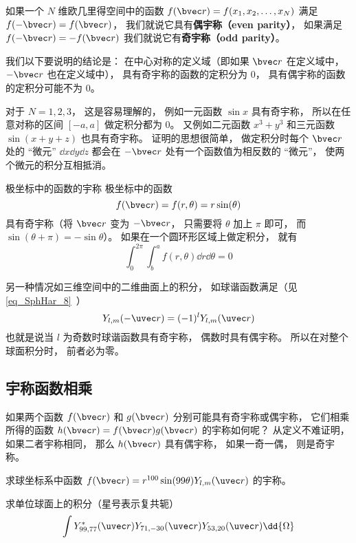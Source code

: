 

如果一个 $N$ 维欧几里得空间中的函数 $f(\bvec r) = f(x_1, x_2, \dots, x_N)$ 满足  $f(-\bvec r) = f(\bvec r)$， 我们就说它具有\textbf{偶宇称（even parity）}， 如果满足  $f(-\bvec r) = -f(\bvec r)$ 我们就说它有\textbf{奇宇称（odd parity）}。

我们以下要说明的结论是： 在中心对称的定义域（即如果 $\bvec r$ 在定义域中， $-\bvec r$ 也在定义域中）， 具有奇宇称的函数的定积分为 0， 具有偶宇称的函数的定积分可能不为 0。

对于 $N = 1, 2, 3$， 这是容易理解的， 例如一元函数 $\sin x$ 具有奇宇称， 所以在任意对称的区间 $[-a, a]$ 做定积分都为 0。 又例如二元函数 $x^3 + y^3$ 和三元函数 $\sin(x + y + z)$ 也具有奇宇称。 证明的思想很简单， 做定积分时每个 $\bvec r$ 处的 “微元” $\dd{x}\dd{y}\dd{z}$ 都会在 $-\bvec r$ 处有一个函数值为相反数的 “微元”， 使两个微元的积分互相抵消。

\begin{example}{极坐标中的函数的宇称}
极坐标中的函数
\begin{equation}\label{eq_IntPry_1}
f(\bvec r) = f(r, \theta) = r\sin(\theta)
\end{equation}
具有奇宇称（将 $\bvec r$ 变为 $-\bvec r$， 只需要将 $\theta$ 加上 $\pi$ 即可， 而 $\sin(\theta + \pi) = -\sin\theta$）。 如果在一个圆环形区域上做定积分， 就有
\begin{equation}
\int_0^{2\pi} \int_b^a f(r, \theta) \dd{r} \dd{\theta} = 0
\end{equation}
\end{example}

另一种情况如三维空间中的二维曲面上的积分， 如球谐函数满足（见\autoref{eq_SphHar_8}~）
\begin{equation}\label{eq_IntPry_3}
Y_{l,m}(-\uvec r) = (-1)^l Y_{l,m}(\uvec r)
\end{equation}
也就是说当 $l$ 为奇数时球谐函数具有奇宇称， 偶数时具有偶宇称。 所以在对整个球面积分时， 前者必为零。

\subsection{宇称函数相乘}
如果两个函数 $f(\bvec r)$ 和 $g(\bvec r)$ 分别可能具有奇宇称或偶宇称， 它们相乘所得的函数 $h(\bvec r) = f(\bvec r) g(\bvec r)$ 的宇称如何呢？ 从定义不难证明， 如果二者宇称相同， 那么 $h(\bvec r)$ 具有偶宇称， 如果一奇一偶， 则是奇宇称。

\begin{exercise}{}
求球坐标系中函数 $f(\bvec r) = r^{100}\sin(99\theta) Y_{l, m}(\uvec r)$ 的宇称。
\end{exercise}

\begin{exercise}{}
求单位球面上的积分（星号表示复共轭）
\begin{equation}
\int Y_{99, 77}^*(\uvec r) Y_{71, -30}(\uvec r) Y_{53, 20}(\uvec r) \dd{\Omega}
\end{equation}
\end{exercise}
